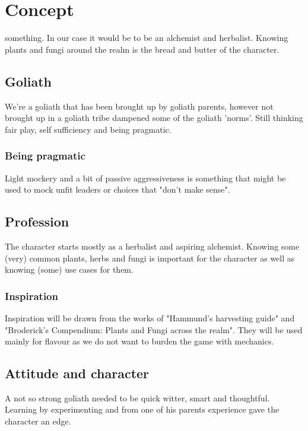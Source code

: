 \ifdm
    \chapter{Concept}
    \label{concept}

     something. In our case it would be to be an alchemist and herbalist. Knowing plants and fungi around the realm is the bread and butter of the character.

    \section{Goliath} 
    We're a goliath that has been brought up by goliath parents, however not brought up in a goliath tribe dampened some of the goliath 'norms'. Still thinking fair play, self sufficiency and being pragmatic.

    \subsection{Being pragmatic}
    Light mockery and a bit of passive aggressiveness is something that might be used to mock unfit leaders or choices that "don't make sense".

    \section{Profession}
    The character starts mostly as a herbalist and aspiring alchemist. Knowing some (very) common plants, herbs and fungi is important for the character as well as knowing (some) use cases for them.

    \subsection{Inspiration}
    Inspiration will be drawn from the works of "Hammund's harvesting guide" and "Broderick's Compendium: Plants and Fungi across the realm". They will be used mainly for flavour as we do not want to burden the game with mechanics.

    \section{Attitude and character}
    A not so strong goliath needed to be quick witter, smart and thoughtful. Learning by experimenting and from one of his parents experience gave the character an edge.

